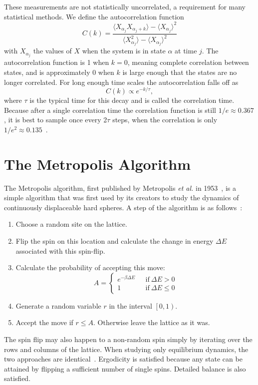 \documentclass[11pt, a4paper]{report} %
\begin{document}
These measurements are not statistically uncorrelated, a requirement for many statistical methods.
We define the autocorrelation function~\cite{binney:1992}
\begin{equation}
	C(k) = \frac{\langle X_{\alpha_j} X_{\alpha_j+k} \rangle - \langle X_{\alpha_j} \rangle^2}{\langle X_{\alpha_j}^2 \rangle - \langle X_{\alpha_j} \rangle^2}
\end{equation}
with \(X_{\alpha_j}\) the values of \(X\) when the system is in state \(\alpha\) at time \(j\).
The autocorrelation function is 1 when \(k=0\), meaning complete correlation between states, and is approximately 0 when \(k\) is large enough that the states are no longer correlated.
For long enough time scales the autocorrelation falls off as
\begin{equation}
	C(k) \propto e^{-k/\tau},
\end{equation}
where \(\tau\) is the typical time for this decay and is called the correlation time.
Because after a single correlation time the correlation function is still \(1/e\approx0.367\), it is best to sample once every 2\(\tau\) steps, when the correlation is only \(1/e^2\approx 0.135\)~\cite{newman:1999}.


\section{The Metropolis Algorithm}
The Metropolis algorithm, first published by Metropolis \textit{et al.} in 1953~\cite{metropolis:1953}, is a simple algorithm that was first used by its creators to study the dynamics of continuously displaceable hard spheres.
A step of the algorithm is as follows~\cite{binney:1992}:
\begin{enumerate}
	\item Choose a random site on the lattice.
	\item Flip the spin on this location and calculate the change in energy \(\Delta E\) associated with this spin-flip.
	\item Calculate the probability of accepting this move:
	\begin{equation}
		A =
		\begin{cases}
			e^{-\beta \Delta E}\ \ \ &\mathrm{if}\ \Delta E > 0 \\
			1 \ \ \ &\mathrm{if}\ \Delta E \leq 0
		\end{cases}
	\end{equation}
	\item Generate a random variable \(r\) in the interval \(\left[0, 1\right)\).
	\item Accept the move if \(r \leq A\). Otherwise leave the lattice as it was.
\end{enumerate}
The spin flip may also happen to a non-random spin simply by iterating over the rows and columns of the lattice. When studying only equilibrium dynamics, the two approaches are identical~\cite{landau:2015}.
Ergodicity is satisfied because any state can be attained by flipping a sufficient number of single spins. Detailed balance is also satisfied.
\end{document}
